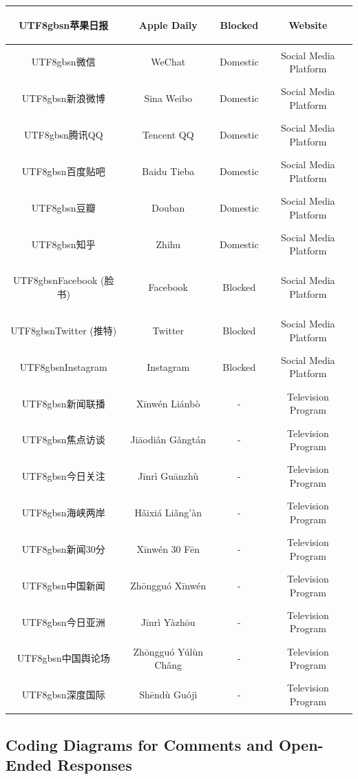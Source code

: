 \documentclass[11pt]{article}
\newcommand{\zh}[1]{\begin{CJK*}{UTF8}{gbsn}#1\end{CJK*}}
\begin{document}
\begin{table}[H]
{\begin{tabular}{|c|c|c|c|}
        \zh{苹果日报} & Apple Daily & Blocked & Website \\ \hline
        \zh{微信} & WeChat & Domestic & Social Media Platform \\ \hline
        \zh{新浪微博} & Sina Weibo & Domestic & Social Media Platform \\ \hline
        \zh{腾讯QQ} & Tencent QQ & Domestic & Social Media Platform \\ \hline
        \zh{百度贴吧} & Baidu Tieba & Domestic & Social Media Platform \\ \hline
        \zh{豆瓣} & Douban & Domestic & Social Media Platform \\ \hline
        \zh{知乎} & Zhihu & Domestic & Social Media Platform \\ \hline
        \zh{Facebook (脸书)} & Facebook & Blocked & Social Media Platform \\ \hline
        \zh{Twitter (推特)} & Twitter & Blocked & Social Media Platform \\ \hline
        \zh{Instagram} & Instagram & Blocked & Social Media Platform \\ \hline
        \zh{新闻联播} & Xīnwén Liánbò & - & Television Program \\ \hline
        \zh{焦点访谈} & Jiāodiǎn Gǎngtán & - & Television Program \\ \hline
        \zh{今日关注} & Jīnrì Guānzhù & - & Television Program \\ \hline
        \zh{海峡两岸} & Hǎixiá Liǎng'àn & - & Television Program \\ \hline
        \zh{新闻30分} & Xīnwén 30 Fēn & - & Television Program \\ \hline
        \zh{中国新闻} & Zhōngguó Xīnwén & - & Television Program \\ \hline
        \zh{今日亚洲} & Jīnrì Yàzhōu & - & Television Program \\ \hline
        \zh{中国舆论场} & Zhōngguó Yúlùn Chǎng & - & Television Program \\ \hline
        \zh{深度国际} & Shēndù Guójì & - & Television Program \\ \hline
  \end{tabular}
  }
  \label{exposure}
\end{table}

\subsection{Coding Diagrams for Comments and Open-Ended Responses}\label{diags}
\end{document}
